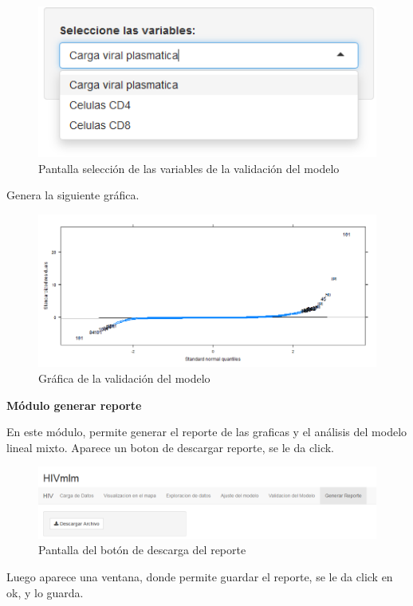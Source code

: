 \begin{figure}[H]
\centering
\includegraphics[scale=0.6]{valido2.PNG}
\caption{Pantalla selecci\'on de las variables de la validaci\'on del modelo}
\end{figure}

Genera la siguiente gr\'afica.

\begin{figure}[H]
\centering
\includegraphics[scale=0.6]{valido.PNG}
\caption{Gr\'afica de la validaci\'on del modelo}
\end{figure}

\textbf{M\'odulo generar reporte}

En este m\'odulo, permite generar el reporte de las graficas y el an\'alisis del modelo lineal mixto. Aparece un boton de descargar reporte, se le da click.

\begin{figure}[H]
\centering
\includegraphics[scale=0.6]{reporte2.PNG}
\caption{Pantalla del bot\'on de descarga del reporte}
\end{figure}

Luego aparece una ventana, donde permite guardar el reporte, se le da click en ok, y lo guarda.

